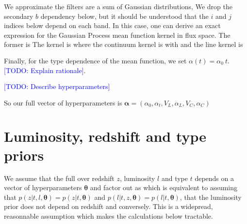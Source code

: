 \documentclass[aps,prd,showpacs,superscriptaddress,groupedaddress]{revtex4}  %
\newcommand{\todo}[1]{\textcolor{blue}{[TODO: #1]}}
\begin{document}
We approximate the filters are a sum of Gaussian distributions,
We drop the secondary $b$ dependency below, but it should be understood that the $i$ and $j$ indices below depend on each band.
In this case, one can derive an exact expression for the Gaussian Process mean function kernel in flux space. The former is
The kernel is
where the continuum kernel is
with
and the line kernel is

Finally, for the type dependence of the mean function, we set $\alpha(t) = \alpha_0 \ t$. \todo{Explain rationale}.

\todo{Describe hyperparameters}

So our full vector of hyperparameters is $\bm{\alpha} = (\alpha_0, \alpha_t, V_L,  \alpha_L, V_C, \alpha_C)$

\section{Luminosity, redshift and type priors}

We assume that the full over redshift $z$, luminosity $l$ and type $t$ depends on a vector of hyperparameters $\bm{\theta}$ and   factor out as
which is equivalent to assuming that $p(z | t, l, \bm{\theta}) = p(z | t, \bm{\theta})$ and $p(l | t, z, \bm{\theta})=p(l | t, \bm{\theta})$, \ie that the luminosity prior does not depend on redshift and conversely. 
This is a widepread, reasonnable assumption which makes the calculations below tractable.
\end{document}
